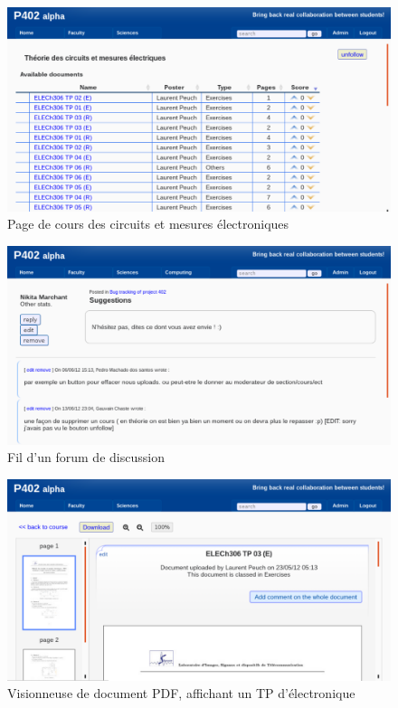 \documentclass[a4paper,12pt]{article}
\begin{document}
\begin{figure}
  \centering\includegraphics[scale=0.5]{imgs/cours.pdf}
  \caption{Page de cours des circuits et mesures électroniques}
  \label{fig:course}
\end{figure}

\begin{figure}
  \centering\includegraphics[scale=0.5]{imgs/forum.pdf}
  \caption{Fil d'un forum de discussion}
  \label{fig:forum}
\end{figure}

\begin{figure}
  \centering\includegraphics[scale=0.5]{imgs/viewer.pdf}
  \caption{Visionneuse de document PDF, affichant un TP d'électronique}
  \label{fig:viewer}
\end{figure}
	
\end{document}
